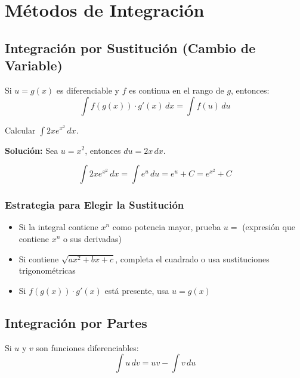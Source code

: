 \documentclass[12pt, a4paper]{book}
\begin{document}
\chapter{Métodos de Integración}

\section{Integración por Sustitución (Cambio de Variable)}

\begin{teorema}
Si $u = g(x)$ es diferenciable y $f$ es continua en el rango de $g$, entonces:
\[
\int f(g(x)) \cdot g'(x) \, dx = \int f(u) \, du
\]
\end{teorema}

\begin{ejemplo}
Calcular $\int 2x e^{x^2} \, dx$.

\textbf{Solución:}
Sea $u = x^2$, entonces $du = 2x \, dx$.

\[
\int 2x e^{x^2} \, dx = \int e^u \, du = e^u + C = e^{x^2} + C
\]
\end{ejemplo}

\subsection{Estrategia para Elegir la Sustitución}

\begin{itemize}
    \item Si la integral contiene $x^n$ como potencia mayor, prueba $u = $ (expresión que contiene $x^n$ o sus derivadas)
    \item Si contiene $\sqrt{ax^2 + bx + c}$, completa el cuadrado o usa sustituciones trigonométricas
    \item Si $f(g(x)) \cdot g'(x)$ está presente, usa $u = g(x)$
\end{itemize}

\section{Integración por Partes}

\begin{teorema}
Si $u$ y $v$ son funciones diferenciables:
\[
\int u \, dv = uv - \int v \, du
\]
\end{teorema}
\end{document}
